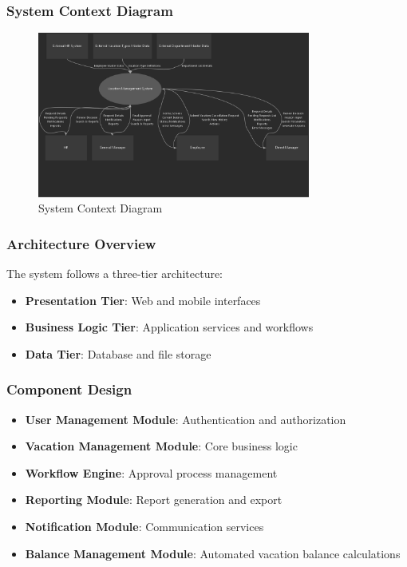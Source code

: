 \documentclass[12pt,a4paper]{article}
\begin{document}
\subsubsection{System Context Diagram}
\begin{figure}[H]
\centering
\includegraphics[width=0.8\textwidth]{Diagrams/Context/context.png}
\caption{System Context Diagram}
\label{fig:context}
\end{figure}

\subsubsection{Architecture Overview}
The system follows a three-tier architecture:
\begin{itemize}
    \item \textbf{Presentation Tier}: Web and mobile interfaces
    \item \textbf{Business Logic Tier}: Application services and workflows
    \item \textbf{Data Tier}: Database and file storage
\end{itemize}

\subsubsection{Component Design}
\begin{itemize}
    \item \textbf{User Management Module}: Authentication and authorization
    \item \textbf{Vacation Management Module}: Core business logic
    \item \textbf{Workflow Engine}: Approval process management
    \item \textbf{Reporting Module}: Report generation and export
    \item \textbf{Notification Module}: Communication services
    \item \textbf{Balance Management Module}: Automated vacation balance calculations
\end{itemize}
\end{document}
